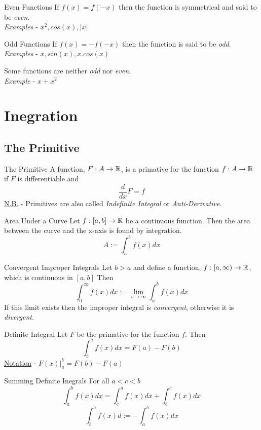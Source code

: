 \documentclass[11pt,a4paper]{article}
\begin{document}
\subtitle{Definition 3.12 - }{Even Functions}
If $f(x) = f(-x)$ then the function is symmetrical and said to be \textit{even}. \\
\textit{Examples} - $x^2, cos(x), |x|$ \\

\subtitle{Definition 3.13 - }{Odd Functions}
If $f(x) = -f(-x)$ then the function is said to be \textit{odd}. \\
\textit{Examples} - $x, sin(x), x.cos(x)$\\

\subtitle{Remark 3.14}{}
Some functions are neither \textit{odd} nor \textit{even}. \\
\textit{Example} - $x + x^2$

\section{Inegration}
%
\subsection{The Primitive}

\subtitle{Definition 4.01 - }{The Primitive}
A function, $F : A \to \mathbb{R}$, is a primative for the function $f : A \to \mathbb{R}$ if $F$ is differentiable and $$\displaystyle{\frac{d}{dx} F = f}$$
\underline{N.B.} - Primitives are also called \textit{Indefinite Integral} or \textit{Anti-Derivative}. \\

\subtitle{Remark 4.02 - }{Area Under a Curve}
Let $f : [a,b] \to \mathbb{R}$ be a continuous function. Then the area between the curve and the x-axis is found by integration. $$A := \int_{a}^{b} f(x) dx$$

\subtitle{Definition 4.03 - }{Convergent Improper Integrals}
Let $b > a$ and define a function, $f : \left[a, \infty\right) \to \mathbb{R}$, which is continuous in $[a, b]$ Then
$$\int_{0}^{\infty} f(x) dx := \lim_{b \to \infty} \int_{a}^{b} f(x) dx$$
If this limit exists then the improper integral is \textit{convergent}, otherwise it is \textit{divergent}. \\

\subtitle{Definition 4.04 - }{Definite Integral}
Let $F$ be the primative for the function $f$. Then $$\int_{b}^{a} f(x) dx = F(a) - F(b)$$
\underline{Notation} - $F(x)\big|_{a}^{b} = F(b) - F(a)$\\

\subtitle{Remark 4.05 - }{Summing Definite Inegrals}
For all $a < c < b$ $$\int_{a}^{b} f(x) dx = \int_{c}^{a} f(x) dx + \int_{b}^{c} f(x) dx$$ $$\displaystyle{\int_{b}^{a} f(x) d := -\int_{a}^{b} f(x) dx}$$
\end{document}
